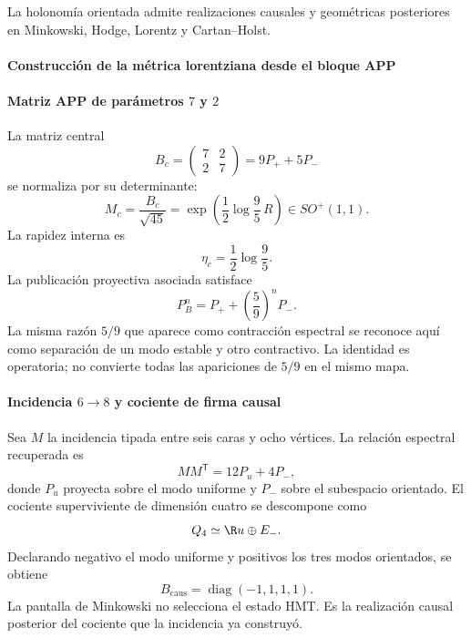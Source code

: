 \noindent La holonomía orientada admite realizaciones causales y geométricas posteriores en Minkowski, Hodge, Lorentz y Cartan--Holst.\par\medskip

\paragraph{Construcción de la métrica lorentziana desde el bloque APP}

\paragraph{Matriz APP de parámetros \(7\) y \(2\)}

La matriz central
\begin{equation}
B_c=\begin{pmatrix}7&2\\2&7\end{pmatrix}
=9P_++5P_-
\label{eq:Bc}
\end{equation}
se normaliza por su determinante:
\begin{equation}
M_c=\frac{B_c}{\sqrt{45}}
=\exp\left(\frac12\log\frac95\,R\right)
\in SO^+(1,1).
\label{eq:Mc}
\end{equation}
La rapidez interna es
\[
\eta_c=\frac12\log\frac95.
\]
La publicación proyectiva asociada satisface
\begin{equation}
P_B^n=P_++\left(\frac59\right)^nP_-.
\label{eq:PB-contract}
\end{equation}
La misma razón \(5/9\) que aparece como contracción espectral se reconoce aquí
como separación de un modo estable y otro contractivo. La identidad es
operatoria; no convierte todas las apariciones de \(5/9\) en el mismo mapa.

\paragraph{Incidencia \(6\to8\) y cociente de firma causal}

Sea \(M\) la incidencia tipada entre seis caras y ocho vértices. La relación
espectral recuperada es
\begin{equation}
MM^{\mathsf T}=12P_u+4P_-,
\label{eq:MMt}
\end{equation}
donde \(P_u\) proyecta sobre el modo uniforme y \(P_-\) sobre el subespacio
orientado. El cociente superviviente de dimensión cuatro se descompone como
\begin{equation}
Q_4\simeq\R u\oplus E_-.
\label{eq:radion-Q4}
\end{equation}
Declarando negativo el modo uniforme y positivos los tres modos orientados,
se obtiene
\begin{equation}
B_{\mathrm{caus}}=\operatorname{diag}(-1,1,1,1).
\label{eq:minkowski}
\end{equation}
La pantalla de Minkowski no selecciona el estado HMT. Es la realización
causal posterior del cociente que la incidencia ya construyó.

